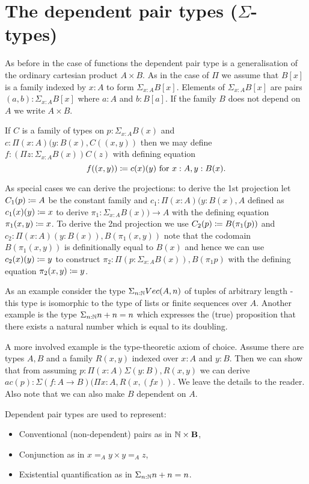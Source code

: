 \section{The dependent pair types ($\Sigma$-types)}

As before in the case of functions the dependent pair type is a
generalisation of the ordinary cartesian product $A \times B$. 
As in the case of $\Pi$ we assume that $B[x]$ is a family indexed by
$x:A$ to form $\Sigma_{x:A}B[x]$. Elements of $\Sigma_{x:A}B[x]$ are
pairs $(a,b) : \Sigma_{x:A}B[x]$ where $a:A$ and $b:B[a]$. If the
family $B$ does not depend on $A$ we write $A \times B$.

If $C$ is a family of types on $p:\Sigma_{x:A}B(x)$ and 
$c:\Pi (x:A)(y:B(x),C((x,y))$ then we may define 
$f:(\Pi z:\Sigma_{x:A}B(x))C(z)$ with defining equation
  \[f((x,y))\coloneqq c(x)(y)\mbox{ for } x:A,y:B(x).\]

As special cases we can derive the projections: to derive the 1st
projection let $C_1(p) \coloneqq A$ be the constant family and $c_1 : \Pi (x:A)(y:B(x),A$
defined as $c_1(x)(y) \coloneqq x$ to derive $\pi_1 : \Sigma_{x:A}B(x)) \to A$
with the defining equation $\pi_1 (x,y) \coloneqq x$. To derive the 2nd
projection we use $C_2(p) \coloneqq B (\pi_1(p))$ and $c_2 : \Pi
(x:A)(y:B(x)),B(\pi_1(x,y))$ note that the codomain $B(\pi_1(x,y))$ is
definitionally equal to $B(x)$ and hence we can use $c_2(x)(y) \coloneqq
y$ to construct $\pi_2 : \Pi(p : \Sigma_{x:A}{B(x)}),B(\pi_1 p)$ with
the defining equation $\pi_2(x,y) \coloneqq y$.

As an example consider the type $\Sigma_{n:\mathbb{N}}Vec(A,n)$ of tuples of
arbitrary length - this type is isomorphic to the type of lists or
finite sequences over $A$. Another example is the type
$\Sigma_{n:\mathbb{N}}n+n = n$ which expresses the (true) proposition that
there exists a natural number which is equal to its doubling.

A more involved example is the type-theoretic axiom of choice. Assume
there are types $A,B$ and a family $R(x,y)$ indexed over $x:A$ and
$y:B$. Then we can show that from assuming $p : \Pi(x:A)\Sigma(y :
B),R(x,y)$ we can derive $ac(p) : \Sigma(f : A \to B)(\Pi x:A,R(x,(f
x))$. We leave the details to the reader. Also note that we can also
make $B$ dependent on $A$.

Dependent pair types are used to represent:
\begin{itemize}
\item Conventional (non-dependent) pairs as in $\mathbb{N} \times {\bf B}$,
\item Conjunction as in $x =_A y \times y =_A z$,
\item Existential quantification as in $\Sigma_{n:\mathbb{N}}n+n = n$.
\end{itemize}




